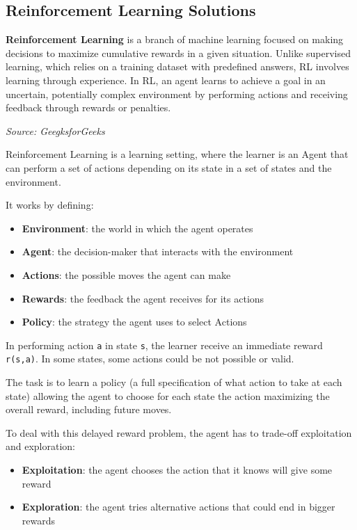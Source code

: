 \subsection{Reinforcement Learning Solutions}
\begin{blockquote}
  \textbf{Reinforcement Learning} is a branch of machine learning focused on
  making decisions to maximize cumulative rewards in a given situation. Unlike supervised
  learning, which relies on a training dataset with predefined answers, RL involves
  learning through experience. In RL, an agent learns to achieve a goal in an uncertain,
  potentially complex environment by performing actions and receiving feedback
  through rewards or penalties.

  \emph{Source: GeegksforGeeks \footnotemark}
\end{blockquote}

Reinforcement Learning is a learning setting, where the learner is an Agent that
can perform a set of actions depending on its state in a set of states and the environment.

It works by defining:
\begin{itemize}
  \item \textbf{Environment}: the world in which the agent operates

  \item \textbf{Agent}: the decision-maker that interacts with the environment

  \item \textbf{Actions}: the possible moves the agent can make

  \item \textbf{Rewards}: the feedback the agent receives for its actions

  \item \textbf{Policy}: the strategy the agent uses to select Actions
\end{itemize}

In performing action \texttt{a} in state \texttt{s}, the learner receive an
immediate reward \texttt{r(s,a)}. In some states, some actions could be not possible
or valid.

The task is to learn a policy (a full specification of what action to take at
each state) allowing the agent to choose for each state the action maximizing the
overall reward, including future moves.

To deal with this delayed reward problem, the agent has to trade-off exploitation
and exploration:
\begin{itemize}
  \item \textbf{Exploitation}: the agent chooses the action that it knows will give
    some reward

  \item \textbf{Exploration}: the agent tries alternative actions that could end
    in bigger rewards
\end{itemize}

